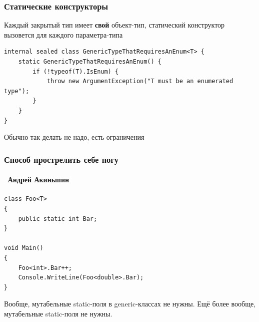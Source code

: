 \documentclass{../../slides-style}
\begin{document}
    \begin{frame}[fragile]
        \frametitle{Статические конструкторы}
        Каждый закрытый тип имеет \textbf{свой} объект-тип, статический конструктор вызовется для каждого параметра-типа
        \vspace{0.8cm}
        \begin{footnotesize}
            \begin{verbatim}
internal sealed class GenericTypeThatRequiresAnEnum<T> {
    static GenericTypeThatRequiresAnEnum() {
        if (!typeof(T).IsEnum) {
            throw new ArgumentException("T must be an enumerated type");
        }
    }
}
            \end{verbatim}
        \end{footnotesize}
        \vspace{0.8cm}
        Обычно так делать не надо, есть ограничения
    \end{frame}

    \begin{frame}[fragile]
        \frametitle{Способ прострелить себе ногу}
        \framesubtitle{\textcopyright\, Андрей Акиньшин}
        \begin{small}
            \begin{verbatim}
class Foo<T>
{
    public static int Bar;
}

void Main()
{
    Foo<int>.Bar++;
    Console.WriteLine(Foo<double>.Bar);
}
            \end{verbatim}
        \end{small}
        Вообще, мутабельные static-поля в generic-классах не нужны. Ещё более вообще, мутабельные static-поля не нужны.
    \end{frame}
\end{document}

